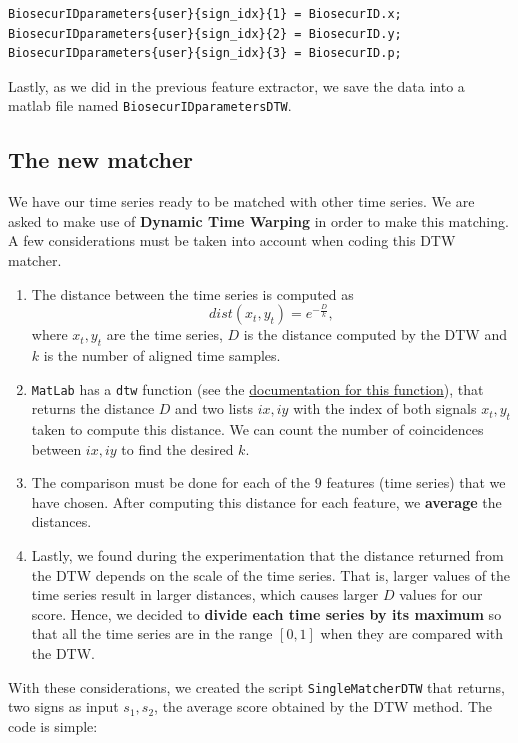 \documentclass[a4paper]{article}
\def\inline{\lstinline[basicstyle=\ttfamily,keywordstyle={}]}
\begin{document}
{\begin{verbatim}
BiosecurIDparameters{user}{sign_idx}{1} = BiosecurID.x; 
BiosecurIDparameters{user}{sign_idx}{2} = BiosecurID.y; 
BiosecurIDparameters{user}{sign_idx}{3} = BiosecurID.p;
\end{verbatim}



Lastly, as we did in the previous feature extractor, we save the data into a matlab file named \inline{BiosecurIDparametersDTW}.



\subsection*{The new matcher}

We have our time series ready to be matched with other time series. We are asked to make use of \textbf{Dynamic Time Warping} in order to make this matching. A few considerations must be taken into account when coding this DTW matcher.

\begin{enumerate}
\item The distance between the time series is computed as
\[
dist(x_t,y_t) = e^{-\frac{D}{k}},  
\]
where \(x_t,y_t\) are the time series, \(D\) is the distance computed by the DTW and \(k\) is the number of aligned time samples. 
\item \inline{MatLab} has a \inline{dtw} function (see the \href{https://uk.mathworks.com/help/signal/ref/dtw.html}{documentation for this function}), that returns the distance \(D\) and two lists \(ix,iy\) with the index of both signals \(x_t,y_t\) taken to compute this distance. We can count the number of coincidences between \(ix,iy\) to find the desired \(k\).
\item The comparison must be done for each of the \(9\) features (time series) that we have chosen. After computing this distance for each feature, we \textbf{average} the distances.
\item Lastly, we found during the experimentation that the distance returned from the DTW depends on the scale of the time series. That is, larger values of the time series result in larger distances, which causes larger \(D\) values for our score. Hence, we decided to \textbf{divide each time series by its maximum} so that all the time series are in the range \([0,1]\) when they are compared with the DTW. 
\end{enumerate}
With these considerations, we created the script \inline{SingleMatcherDTW} that returns, two signs as input \(s_1,s_2\), the average score obtained by the DTW method. The code is simple:

}
\end{document}
